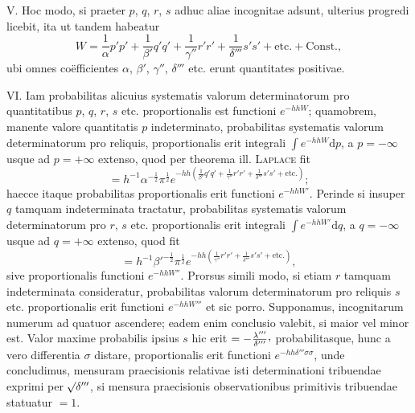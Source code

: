 V. Hoc modo, si praeter $p$, $q$, $r$, $s$ adhuc aliae incognitae adsunt,
ulterius progredi licebit, ita ut tandem habeatur
\[
W=\frac{1}{\alpha}p'p'+\frac{1}{\beta'}q'q'+\frac{1}{\gamma''}r'r'
+\frac{1}{\delta'''}s's'+\text{etc.}+\text{Const.},
\]
ubi omnes coëfficientes $\alpha$, $\beta'$, $\gamma''$, $\delta'''$ etc.
erunt quantitates positivae.

VI. Iam probabilitas alicuius systematis valorum determinatorum pro
quantitatibus $p$, $q$, $r$, $s$ etc. proportionalis\HistoricalNoteEight{Handschriftliche Bemerkung:] \emph{Aequalis} [producto] functioni[s\quad\raisebox{.65ex}{.}
\[
e^{-hh\left(\frac{1}{\alpha}p'p'+\frac{1}{\beta'}q'q'+\frac{1}{\gamma''}r'r'+\frac{1}{\delta'''}s's'+\text{etc.}\right)}
\]
per factorem constantem]
$\frac{h^\nu\BareRoot{(\alpha\beta'\gamma''\delta'''\ldots)}}{(\BareRoot{\pi})^\nu}e^{-hh\,\text{Const.}}$,
ubi Const. designat partem ultimam constantem ipsius $W$.}
est functioni $e^{-hhW}$; quamobrem,
manente valore quantitatis $p$ indeterminato, probabilitas
systematis valorum determinatorum pro reliquis, proportionalis erit
integrali $\int e^{-hhW}\mathrm{d}p$, a $p=-\infty$ usque ad $p=+\infty$
extenso, quod per theorema ill. \textsc{Laplace} fit
\[
=h^{-1}\alpha^{-\frac12}\pi^{\frac12}
e^{-hh\left(\frac{1}{\beta'}q'q'+\frac{1}{\gamma''}r'r'+\frac{1}{\delta'''}s's'+\text{etc.}\right)};
\]
haecce itaque probabilitas proportionalis erit functioni $e^{-hhW'}$.
Perinde si insuper $q$ tamquam indeterminata tractatur, probabilitas
systematis valorum determinatorum pro $r$, $s$ etc. proportionalis erit
integrali $\int e^{-hhW'}\mathrm{d}q$, a $q=-\infty$ usque ad $q=+\infty$
extenso, quod fit
\[
=h^{-1}{\beta'}^{-\frac12}\pi^{\frac12}
e^{-hh\left(\frac{1}{\gamma''}r'r'+\frac{1}{\delta'''}s's'+\text{etc.}\right)},
\]
sive proportionalis functioni $e^{-hhW''}$. Prorsus simili modo, si etiam
$r$ tamquam indeterminata consideratur, probabilitas valorum
determinatorum pro reliquis $s$ etc. proportionalis erit functioni
$e^{-hhW'''}$ et sic porro. Supponamus, incognitarum numerum ad quatuor
ascendere; eadem enim conclusio valebit, si maior vel minor est. Valor
maxime probabilis ipsius $s$ hic erit
$=-\frac{\lambda'''}{\delta'''}\mathpunct{\raisebox{.45ex}{,}}$
probabilitasque, hunc a vero differentia $\sigma$ distare, proportionalis
erit functioni $e^{-hh\delta'''\sigma\sigma}$, unde concludimus, mensuram
praecisionis relativae isti determinationi tribuendae exprimi per
$\mathord{{}^{}\!\surd}\delta'''$, si mensura praecisionis observationibus primitivis
tribuendae statuatur $=1$.
